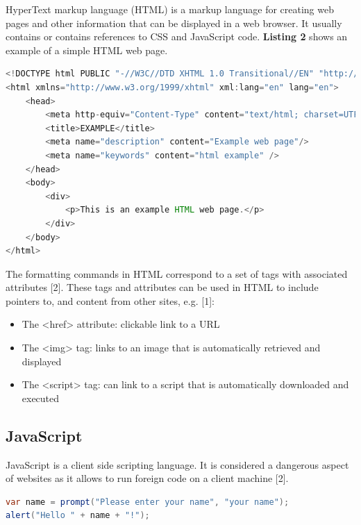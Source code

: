 HyperText markup language (HTML) is a markup language for creating web pages and other information that can be displayed in a web browser. It usually contains or contains references to CSS and JavaScript code. \textbf{Listing 2} shows an example of a simple HTML web page.

\begin{lstlisting}[language=java, caption=An example HTML web page., label=listing:]
<!DOCTYPE html PUBLIC "-//W3C//DTD XHTML 1.0 Transitional//EN" "http://www.w3.org/TR/xhtml1/DTD/xhtml1-transitional.dtd">
<html xmlns="http://www.w3.org/1999/xhtml" xml:lang="en" lang="en">
    <head>
        <meta http-equiv="Content-Type" content="text/html; charset=UTF-8"/>
        <title>EXAMPLE</title>
        <meta name="description" content="Example web page"/>
        <meta name="keywords" content="html example" />
    </head>
    <body>
        <div>
            <p>This is an example HTML web page.</p>
        </div>
    </body>
</html>
\end{lstlisting}

The formatting commands in HTML correspond to a set of tags with associated attributes [2]. These tags and attributes can be used in HTML to include pointers to, and content from other sites, e.g. [1]:
\begin{itemize}
	\item The <href> attribute: clickable link to a URL
	\item The <img> tag: links to an image that is automatically retrieved and displayed
	\item The <script> tag: can link to a script that is automatically  downloaded and executed
\end{itemize}


\subsection{JavaScript}

JavaScript is a client side scripting language. It is considered a dangerous aspect of websites as it allows to run foreign code on a client machine [2].

\begin{lstlisting}[language=java, caption=A simple JavaScript script to welcome a user., label=listing:]
var name = prompt("Please enter your name", "your name");
alert("Hello " + name + "!");
\end{lstlisting}